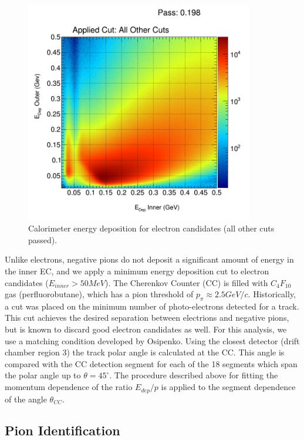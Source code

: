\begin{figure}
  \label{fig:ec_edep}
  \begin{center}
    \includegraphics[width=10cm]{image/h_ec_edep_allOthers_all.png}
    \caption{Calorimeter energy deposition for electron candidates (all other cuts passed).}
  \end{center}
\end{figure}

Unlike electrons, negative pions do not deposit a significant amount of energy in the inner EC, and we apply a minimum energy deposition cut to electron candidates ($E_{inner} > 50 MeV$).  The Cherenkov Counter (CC) is filled with $C_{4}F_{10}$ gas (perfluorobutane), which has a pion threshold of $p_{\pi} \approx 2.5 GeV/c$.  Historically, a cut was placed on the minimum number of photo-electrons detected for a track.  This cut achieves the desired separation between electrions and negative pions, but is known to discard good electron candidates as well.  For this analysis, we use a matching condition developed by Osipenko.  Using the closest detector (drift chamber region 3) the track polar angle is calculated at the CC.  This angle is compared with the CC detection segment for each of the 18 segments which span the polar angle up to $\theta = 45^{\circ}$.  The procedure described above for fitting the momentum dependence of the ratio $E_{dep}/p$ is applied to the segment dependence of the angle $\theta_{CC}$.  
\\
\subsection{Pion Identification}

